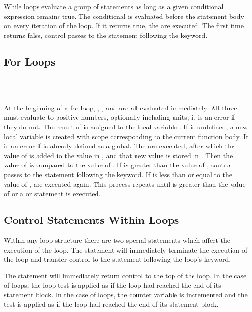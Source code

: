 While loops evaluate a group of statements as long as a given
conditional expression remains true.  The conditional \expr{} is
evaluated before the statement body on every iteration of the loop.
If it returns true, the \statements{} are executed.  The first time \expr{}
returns false, control passes to the statement following the
 keyword.  

\subsection{For Loops}

\begin{syntax}
 \id{}        \\
\codeindent \statements{} \\
\end{syntax}

At the beginning of a for loop, , , and  are
all evaluated immediately.  All three must evaluate to positive
numbers, optionally including units; it is an error if they do not.
The result of  is assigned to the local variable \id{}.  If
\id{} is undefined, a new local variable is created with scope
corresponding to the current function body.  It is an error if \id{}
is already defined as a global.  The \statements{} are executed, after
which the value of  is added to the value in \id{}, and that
new value is stored in \id{}.  Then the value of \id{} is compared to
the value of .  If \id{} is greater than the value of
, control passes to the statement following the 
keyword.  If \id{} is less than or equal to the value of ,
\statements{} are executed again.  This process repeats until \id{} is
greater than the value of  or a  or 
statement is executed.


\subsection{Control Statements Within Loops}

Within any loop structure there are two special statements which
affect the execution of the loop.  The  statement will
immediately terminate the execution of the loop and transfer control
to the statement following the loop's  keyword.  

The  statement will immediately return control to the top of
the loop.  In the case of  loops, the loop test is applied
as if the loop had reached the end of its statement block.  In the
case of  loops, the counter variable is incremented and the test
is applied as if the loop had reached the end of its statement block.

